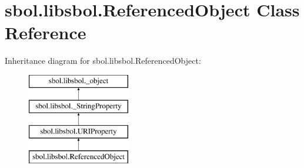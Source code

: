 \hypertarget{classsbol_1_1libsbol_1_1_referenced_object}{}\section{sbol.\+libsbol.\+Referenced\+Object Class Reference}
\label{classsbol_1_1libsbol_1_1_referenced_object}
Inheritance diagram for sbol.\+libsbol.\+Referenced\+Object\+:\begin{figure}[H]
\begin{center}
\leavevmode
\includegraphics[height=4.000000cm]{classsbol_1_1libsbol_1_1_referenced_object}
\end{center}
\end{figure}
